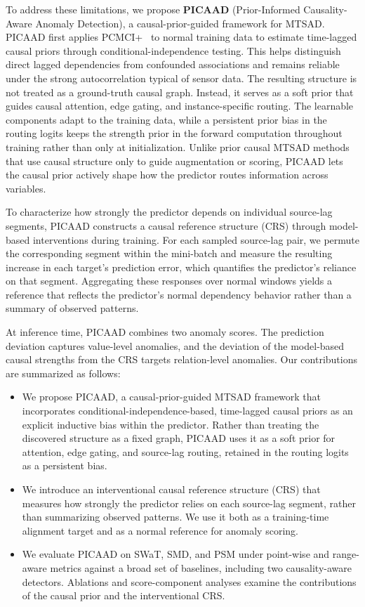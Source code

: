 \documentclass[letterpaper]{article}
\begin{document}
To address these limitations, we propose \textbf{PICAAD} (Prior-Informed Causality-Aware Anomaly Detection), a causal-prior-guided framework for MTSAD. PICAAD first applies PCMCI+~\cite{runge2020pcmciplus} to normal training data to estimate time-lagged causal priors through conditional-independence testing. This helps distinguish direct lagged dependencies from confounded associations and remains reliable under the strong autocorrelation typical of sensor data. The resulting structure is not treated as a ground-truth causal graph. Instead, it serves as a soft prior that guides causal attention, edge gating, and instance-specific routing. The learnable components adapt to the training data, while a persistent prior bias in the routing logits keeps the strength prior in the forward computation throughout training rather than only at initialization. Unlike prior causal MTSAD methods that use causal structure only to guide augmentation or scoring, PICAAD lets the causal prior actively shape how the predictor routes information across variables.

To characterize how strongly the predictor depends on individual source-lag segments, PICAAD constructs a causal reference structure (CRS) through model-based interventions during training. For each sampled source-lag pair, we permute the corresponding segment within the mini-batch and measure the resulting increase in each target's prediction error, which quantifies the predictor's reliance on that segment. Aggregating these responses over normal windows yields a reference that reflects the predictor's normal dependency behavior rather than a summary of observed patterns.

At inference time, PICAAD combines two anomaly scores. The prediction deviation captures value-level anomalies, and the deviation of the model-based causal strengths from the CRS targets relation-level anomalies. Our contributions are summarized as follows:
\begin{itemize}
\item We propose PICAAD, a causal-prior-guided MTSAD framework that incorporates conditional-independence-based, time-lagged causal priors as an explicit inductive bias within the predictor. Rather than treating the discovered structure as a fixed graph, PICAAD uses it as a soft prior for attention, edge gating, and source-lag routing, retained in the routing logits as a persistent bias.
\item We introduce an interventional causal reference structure (CRS) that measures how strongly the predictor relies on each source-lag segment, rather than summarizing observed patterns. We use it both as a training-time alignment target and as a normal reference for anomaly scoring.
\item We evaluate PICAAD on SWaT, SMD, and PSM under point-wise and range-aware metrics against a broad set of baselines, including two causality-aware detectors. Ablations and score-component analyses examine the contributions of the causal prior and the interventional CRS.
\end{itemize}
\end{document}
